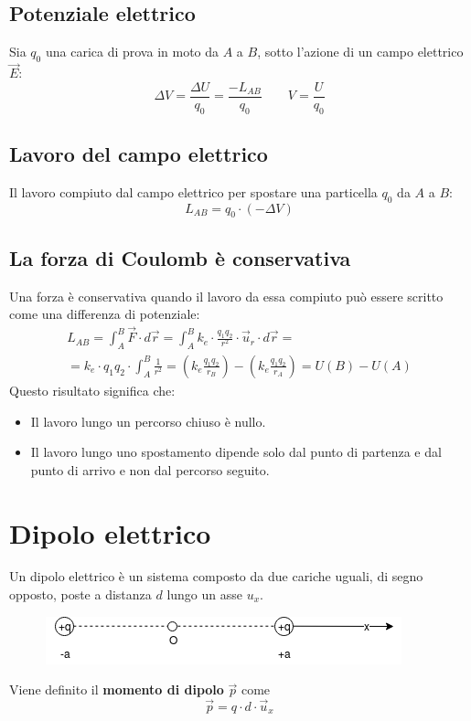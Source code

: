 \subsection{Potenziale elettrico}
Sia $q_0$ una carica di prova in moto da $A$ a $B$, sotto l'azione di un campo elettrico $\vec{E}$:
	\begin{displaymath}
		\Delta V= \frac{\Delta U}{q_0} = \frac{-L_{AB}}{q_0} \qquad V = \frac{U}{q_0}
	\end{displaymath}

\subsection{Lavoro del campo elettrico}
Il lavoro compiuto dal campo elettrico per spostare una particella $q_0$ da $A$ a $B$:
\begin{displaymath}
	L_{AB} = q_0 \cdot (-\Delta V)		
\end{displaymath}


\subsection{La forza di Coulomb è conservativa}
Una forza è conservativa quando il lavoro da essa compiuto può essere scritto come una differenza di potenziale:
\begin{displaymath}\begin{aligned}
	L_{AB} = \int_A^B \vec{F} \cdot d\vec{r} = \int_A^B k_e \cdot \frac{q_1q_2}{r^2} \cdot \vec{u}_r \cdot d\vec{r} =\\
    = k_e \cdot q_1q_2 \cdot \int_A^B \frac{1}{r^2} = \left( k_e \frac{q_1q_2}{r_B}\right) - \left(k_e\frac{q_1q_2}{r_A}\right) = U(B) - U(A)
\end{aligned}\end{displaymath}
Questo risultato significa che:
\begin{itemize}
	\item{Il lavoro lungo un percorso chiuso è nullo.}
    \item{Il lavoro lungo uno spostamento dipende solo dal punto di partenza e dal punto di arrivo e non dal percorso seguito.}
\end{itemize}

\section{Dipolo elettrico}
Un dipolo elettrico è un sistema composto da due cariche uguali, di segno opposto, poste a distanza $d$ lungo un asse $u_x$.\\
\begin{figure}[h!]
	\centering
    \includegraphics[scale=0.6]{Pictures/DipoloElettrico}
\end{figure}
Viene definito il \textbf{momento di dipolo} $\vec{p}$ come 
\begin{displaymath}
	\vec{p} = q \cdot d \cdot \vec{u}_x
\end{displaymath}

